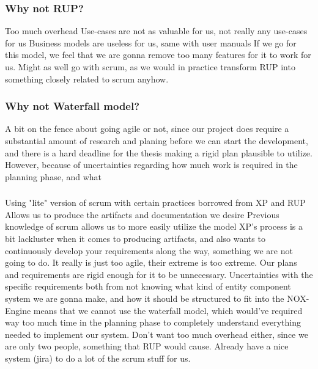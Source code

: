 \subsubsection*{Why not RUP?}
Too much overhead
Use-cases are not as valuable for us, not really any use-cases for us
Business models are useless for us, same with user manuals
If we go for this model, we feel that we are gonna remove too many features for it to work for us.
Might as well go with scrum, as we would in practice transform RUP into something closely related to scrum anyhow.


\subsubsection*{Why not Waterfall model?}

A bit on the fence about going agile or not, since our project does require a substantial amount of research and planing before we can start the development, and there is a hard deadline for the thesis making a rigid plan plausible to utilize. However, because of uncertainties regarding how much work is required in the planning phase, and what

\subsubsection*{}
Using "lite" version of scrum with certain practices borrowed from XP and RUP
Allows us to produce the artifacts and documentation we desire
Previous knowledge of scrum allows us to more easily utilize the model
XP's process is a bit lackluster when it comes to producing artifacts, and also wants to continuously develop your requirements along the way, something we are not going to do. It really is just too agile, their extreme is too extreme. Our plans and requirements are rigid enough for it to be unnecessary.
Uncertainties with the specific requirements both from not knowing what kind of entity component system we are gonna make, and how it should be structured to fit into the NOX-Engine means that we cannot use the waterfall model, which would've required way too much time in the planning phase to completely understand everything needed to implement our system.
Don't want too much overhead either, since we are only two people, something that RUP would cause.
Already have a nice system (jira) to do a lot of the scrum stuff for us.
